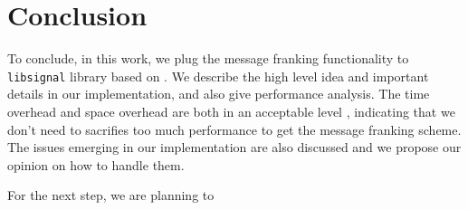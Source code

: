 
\section{Conclusion}
To conclude,
in this work, we plug the message franking functionality to \texttt{libsignal} library
based on \cite{grubbs_message_2017}.
We describe the high level idea and important details in our implementation,
and also give performance analysis. 
The time overhead and space overhead are both in an acceptable level ,
indicating that we don't need to sacrifies too much performance to get the message franking scheme.
The issues emerging in our implementation are also discussed and
we propose our opinion on how to handle them.

For the next step,
we are planning to 